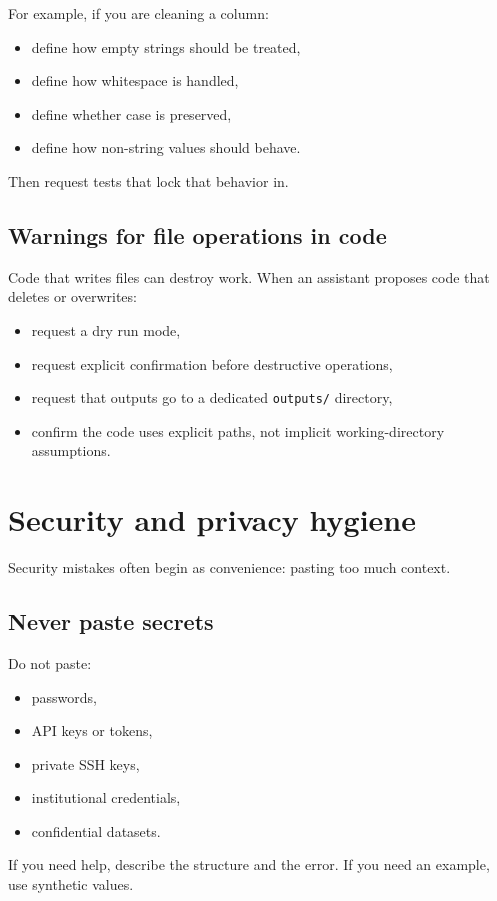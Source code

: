 For example, if you are cleaning a column:
\begin{itemize}[noitemsep]
  \item define how empty strings should be treated,
  \item define how whitespace is handled,
  \item define whether case is preserved,
  \item define how non-string values should behave.
\end{itemize}

Then request tests that lock that behavior in.

\subsection{Warnings for file operations in code}
Code that writes files can destroy work. When an assistant proposes code that deletes or overwrites:
\begin{itemize}[noitemsep]
  \item request a dry run mode,
  \item request explicit confirmation before destructive operations,
  \item request that outputs go to a dedicated \texttt{outputs/} directory,
  \item confirm the code uses explicit paths, not implicit working-directory assumptions.
\end{itemize}

\section{Security and privacy hygiene}
Security mistakes often begin as convenience: pasting too much context.

\subsection{Never paste secrets}
Do not paste:
\begin{itemize}[noitemsep]
  \item passwords,
  \item API keys or tokens,
  \item private SSH keys,
  \item institutional credentials,
  \item confidential datasets.
\end{itemize}

If you need help, describe the structure and the error. If you need an example, use synthetic values.

